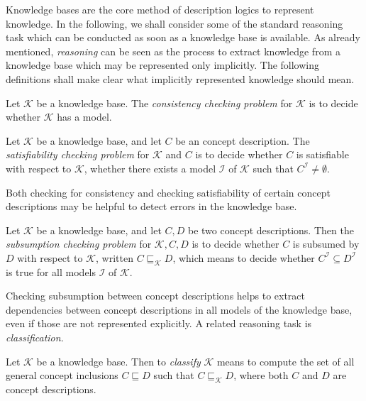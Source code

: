 Knowledge bases are the core method of description logics to represent knowledge.  In the
following, we shall consider some of the standard reasoning task which can be conducted as
soon as a knowledge base is available.  As already mentioned, \emph{reasoning} can be seen
as the process to extract knowledge from a knowledge base which may be represented only
implicitly.  The following definitions shall make clear what implicitly represented
knowledge should mean.

\begin{Definition}
  \label{def:concistency-checking}
  Let $\mathcal{K}$ be a knowledge base.  The \emph{consistency checking problem} for
  $\mathcal{K}$ is to decide whether $\mathcal{K}$ has a model.
\end{Definition}

\begin{Definition}
  \label{def:satisfiability-checking}
  Let $\mathcal{K}$ be a knowledge base, and let $C$ be an concept description.  The
  \emph{satisfiability checking problem} for $\mathcal{K}$ and $C$ is to decide whether
  $C$ is satisfiable with respect to $\mathcal{K}$, \ie whether there exists a model
  $\mathcal{I}$ of $\mathcal{K}$ such that $C^{\mathcal{I}} \neq \emptyset$.
\end{Definition}

Both checking for consistency and checking satisfiability of certain concept descriptions
may be helpful to detect errors in the knowledge base.

\begin{Definition}
  \label{def:subsumption-checking}
  Let $\mathcal{K}$ be a knowledge base, and let $C, D$ be two concept descriptions.  Then
  the \emph{subsumption checking problem} for $\mathcal{K}, C, D$ is to decide whether $C$
  is subsumed by $D$ with respect to $\mathcal{K}$, written $C \sqsubseteq_{\mathcal{K}}
  D$, which means to decide whether $C^{\mathcal{I}} \subseteq D^{\mathcal{I}}$ is true
  for all models $\mathcal{I}$ of $\mathcal{K}$.
\end{Definition}

Checking subsumption between concept descriptions helps to extract dependencies between
concept descriptions in all models of the knowledge base, even if those are not
represented explicitly.  A related reasoning task is \emph{classification}.

\begin{Definition}[Classification]
  \label{def:classification}
  Let $\mathcal{K}$ be a knowledge base.  Then to \emph{classify} $\mathcal{K}$ means to
  compute the set of all general concept inclusions $C \sqsubseteq D$ such that $C
  \sqsubseteq_{\mathcal{K}} D$, where both $C$ and $D$ are concept descriptions.
\end{Definition}


